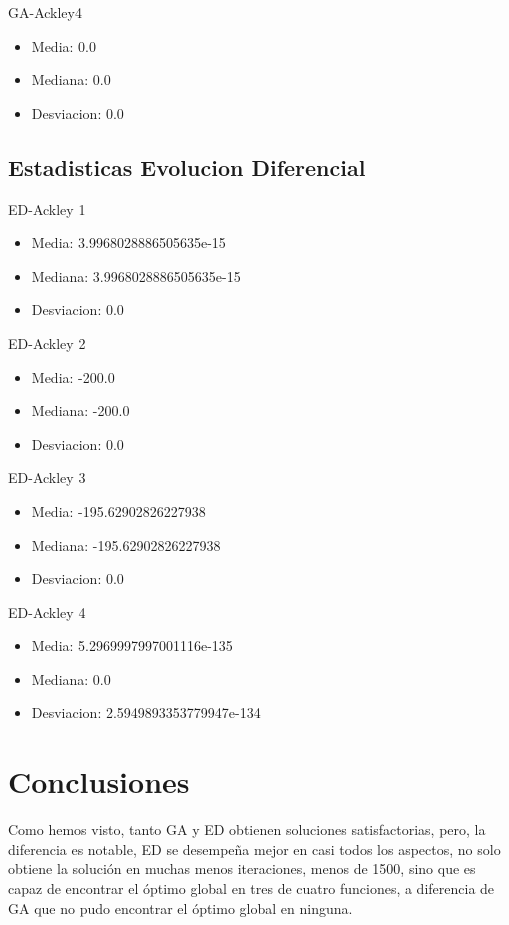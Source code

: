 \documentclass[10pt]{article}
\begin{document}
GA-Ackley4
\begin{itemize}
\item
Media:  0.0 
\item%
Mediana:  0.0 
\item%
Desviacion:  0.0
\end{itemize}

\subsection{Estadisticas Evolucion Diferencial}

ED-Ackley 1
\begin{itemize}
\item
Media:  3.9968028886505635e-15 
\item%
Mediana:  3.9968028886505635e-15 
\item%
Desviacion:  0.0
\end{itemize}

ED-Ackley 2 
\begin{itemize}
\item
Media:  -200.0 
\item%
Mediana:  -200.0 
\item%
Desviacion:  0.0
\end{itemize}

ED-Ackley 3 
\begin{itemize}
\item
Media:  -195.62902826227938 
\item%
Mediana:  -195.62902826227938 
\item%
Desviacion:  0.0
\end{itemize}

ED-Ackley 4 
\begin{itemize}
\item
Media:  5.2969997997001116e-135 
\item%
Mediana:  0.0 
\item%
Desviacion:  2.5949893353779947e-134
\end{itemize}

\section{Conclusiones}
Como hemos visto, tanto GA y ED obtienen soluciones satisfactorias, pero, la diferencia es notable, ED se desempeña mejor en casi todos los aspectos, no solo obtiene la solución en muchas menos iteraciones, menos de 1500, sino que es capaz de encontrar el óptimo global en tres de cuatro funciones, a diferencia de GA que no pudo encontrar el óptimo global en ninguna.
\end{document}
